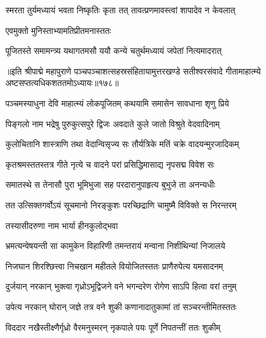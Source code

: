 \twolineshloka
{स्मरता तुर्यमध्यायं भवता निष्कृतिः कृता}
{तत् तावत्प्रणमावस्त्वां शापादेव न केवलात्} %



\onelineshloka
{एवमुक्तो मुनिस्ताभ्यामतिप्रीतमनास्ततः} %

\twolineshloka
{पूजितस्ते समामन्त्र्य यथागतमसौ ययौ}
{कन्ये चतुर्थमध्यायं जपेतां नित्यमादरात्} %

॥इति श्रीपाद्मे महापुराणे पञ्चपञ्चाशत्सहस्रसंहितायामुत्तरखण्डे सतीश्वरसंवादे गीतामाहात्म्ये अष्टसप्तत्यधिकशततमोऽध्यायः॥१७८॥

\genMangalaShloka

\closesub

\ganapatyadiDhyanam
\padmaPuranam



\twolineshloka
{पञ्चमस्याधुना देवि माहात्म्यं लोकपूजितम्}
{कथयामि समासेन सावधाना शृणु प्रिये} %

\twolineshloka
{पिङ्गलो नाम भद्रेषु पुरुकुत्सपुरे द्विजः}
{अवदाते कुले जातो विश्रुते वेदवादिनाम्} %

\twolineshloka
{कुलोचितानि शास्त्राणि तथा वेदान्विसृज्य सः}
{तौर्यत्रिके मतिं चक्रे वादयन्मुरजादिकम्} %

\twolineshloka
{कृतश्रमस्ततस्तत्र गीते नृत्ये च वादने}
{परां प्रसिद्धिमासाद्य नृपसद्म विवेश सः} %

\twolineshloka
{समातस्थे स तेनासौ पुरा भूमिभुजा सह}
{परदारानुपाहृत्य बुभुजे ता अनन्यधीः} %

\twolineshloka
{तत उत्सिक्तगर्वोऽयं सूचमानो निरङ्कुशः}
{परच्छिद्राणि चामुष्मै विविक्ते स निरन्तरम्} %

\onelineshloka
{तस्यासीदरुणा नाम भार्या हीनकुलोद्भवा} %

\twolineshloka
{भ्रमत्यन्वेषयन्ती सा कामुकेन विहारिणी}
{तमन्तरायं मन्वाना निशीथिन्यां निजालये} %

\twolineshloka
{निजघान शिरश्छित्त्वा निचखान महीतले}
{वियोजितस्ततः प्राणैरुपेत्य यमसादनम्} %

\twolineshloka
{दुर्जयान् नरकान् भुक्त्वा गृध्रोऽभूद्विजने वने}
{भगन्दरेण रोगेण साऽपि हित्वा वरां तनुम्} %

\twolineshloka
{उपेत्य नरकान् घोरान् जज्ञे तत्र वने शुकी}
{कणानादातुकामां तां सञ्चरन्तीमितस्ततः} %

\twolineshloka
{विददार नखैस्तीक्ष्णैर्गृध्रो वैरमनुस्मरन्}
{नृकपाले पयः पूर्णे निपतन्तीं ततः शुकीम्} %

